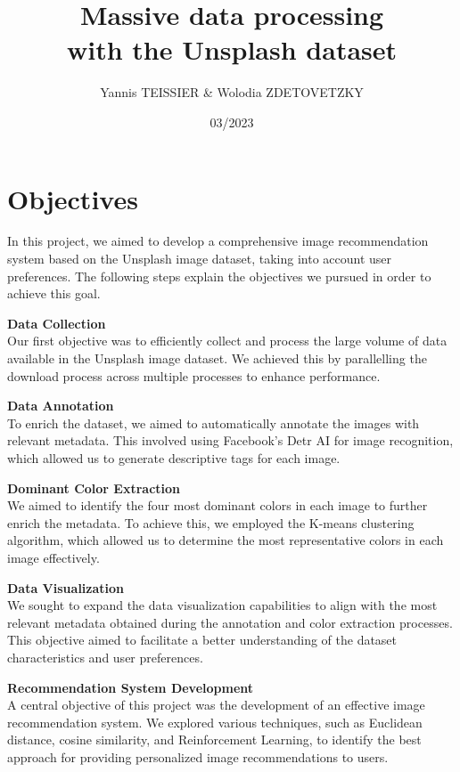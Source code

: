 \documentclass{article}
\title{Massive data processing \\ with the Unsplash dataset}
\author{Yannis TEISSIER \& Wolodia ZDETOVETZKY}
\date{03/2023}
\begin{document}
    \maketitle
    \tableofcontents
    \newpage


    \section{Objectives}\label{sec:objectives}

    In this project, we aimed to develop a comprehensive image recommendation system based on the Unsplash image dataset, taking into account user preferences.
    The following steps explain the objectives we pursued in order to achieve this goal.

    \textbf{Data Collection}\\
    Our first objective was to efficiently collect and process the large volume of data available in the Unsplash image dataset.
    We achieved this by parallelling the download process across multiple processes to enhance performance.

    \textbf{Data Annotation}\\
    To enrich the dataset, we aimed to automatically annotate the images with relevant metadata.
    This involved using Facebook's Detr AI for image recognition, which allowed us to generate descriptive tags for each image.

    \textbf{Dominant Color Extraction}\\
    We aimed to identify the four most dominant colors in each image to further enrich the metadata.
    To achieve this, we employed the K-means clustering algorithm,
    which allowed us to determine the most representative colors in each image effectively.

    \textbf{Data Visualization}\\
    We sought to expand the data visualization capabilities to align with the most relevant metadata obtained during the annotation and color extraction processes.
    This objective aimed to facilitate a better understanding of the dataset characteristics and user preferences.

    \textbf{Recommendation System Development}\\
    A central objective of this project was the development of an effective image recommendation system.
    We explored various techniques, such as Euclidean distance, cosine similarity, and Reinforcement Learning, to identify the best approach for providing personalized image recommendations to users.
\end{document}

